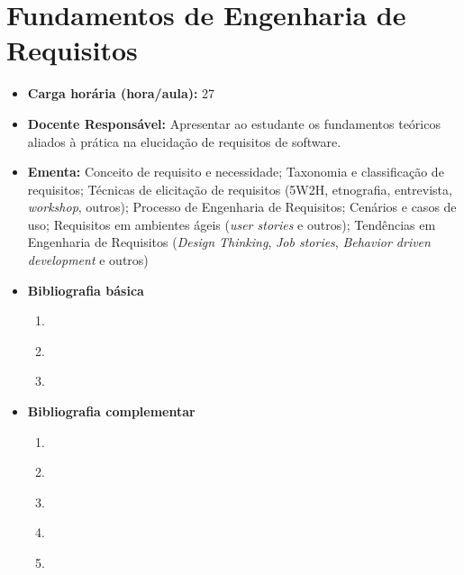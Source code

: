 \documentclass[
	10pt,				%
	openright,			%
	twoside,			%
	a4paper,			%
	english,			%
	french,				%
	brazil,				%
	sumario=tradicional
]{abntex2}
\begin{document}
\section*{Fundamentos de Engenharia de Requisitos}\label{3_engreq}
\begin{itemize}
	\item \textbf{Carga horária (hora/aula):} 27
	\item \textbf{Docente Responsável:} Apresentar ao estudante os fundamentos teóricos aliados à prática na elucidação de requisitos de software.
	\item \textbf{Ementa:} 
	Conceito de requisito e necessidade;
	Taxonomia e classificação de requisitos;
	Técnicas de elicitação de requisitos (5W2H, etnografia, entrevista, \textit{workshop}, outros);
	Processo de Engenharia de Requisitos;
	Cenários e casos de uso;
	Requisitos em ambientes ágeis (\textit{user stories} e outros);
	Tendências em Engenharia de Requisitos (\textit{Design Thinking}, \textit{Job stories}, \textit{Behavior driven development} e outros)
	\item \textbf{Bibliografia básica}
	\begin{enumerate}
		\item \cite{pressman2016engenharia}
		\item \cite{booch2012uml}
		\item \cite{larmanbragatortellojoao2008}
	\end{enumerate}
	\item \textbf{Bibliografia complementar}
	\begin{enumerate}
		\item \cite{sommerville2011engenharia}
		\item \cite{wazlawick2011analise}
		\item \cite{fowlertortello2005}
		\item \cite{teruel2012}
		\item \cite{gammahelmjohnsonvlissides2000}
	\end{enumerate}
\end{itemize}


\newpage
\end{document}
